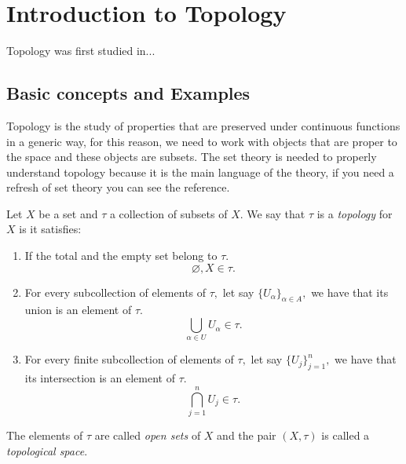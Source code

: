 \documentclass[
	fontsize=10pt, %
	twoside=false, %
	secnumdepth=1, %
]{kaobook}
\begin{document}
\listoftables %

\endgroup


\mainmatter %

\chapter{Introduction to Topology}


Topology was first studied in...

\section{Basic concepts and Examples}

Topology is the study of properties that are preserved under continuous functions in a generic way, for this reason, we need to work with objects that are proper to the space and these objects are subsets. The set theory is needed to properly understand topology because it is the main language of the theory, if you need a refresh of set theory you can see the reference.

\begin{definition}
Let $X$ be a set and $\tau$ a collection of subsets of $X.$ We say that $\tau$ is a \emph{topology} for $X$ is it satisfies:
\begin{enumerate}
\item If the total and the empty set belong to $\tau.$  $$\varnothing, X\in\tau.$$

\item For every subcollection of elements of $\tau,$ let say $\{U_\alpha\}_{\alpha\in A},$ we have that its union is an element of $\tau.$ $$\bigcup_{\alpha \in U} U_\alpha \in \tau.$$

\item For every finite subcollection of elements of $\tau,$ let say $\{U_j\}_{j=1}^n,$ we have that its intersection is an element of $\tau.$ $$ \bigcap_{j=1}^n U_j\in\tau.$$
\end{enumerate}

The elements of $\tau$ are called \emph{open sets} of $X$ and the pair $(X,\tau)$ is called a \emph{topological space}.
\end{definition}
\end{document}
